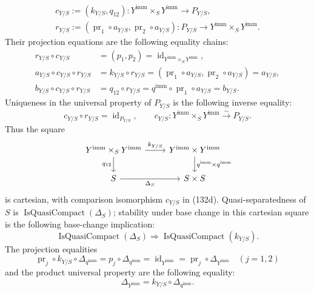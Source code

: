 \begin{definition}
\[\begin{gathered}
    c_{Y/S}:=(k_{Y/S},q_{12})\colon
      Y^{\mathrm{imm}}\times_SY^{\mathrm{imm}}\to P_{Y/S},\\
    r_{Y/S}:=(\operatorname{pr}_1\circ a_{Y/S},
      \operatorname{pr}_2\circ a_{Y/S})\colon
      P_{Y/S}\to Y^{\mathrm{imm}}\times_SY^{\mathrm{imm}}.     
  \end{gathered} \tag{132c}
  \]
  Their projection equations are the following equality chains:
  \[
  \begin{aligned}
    r_{Y/S}\circ c_{Y/S}
      &=(p_1,p_2)=\operatorname{id}_{
        Y^{\mathrm{imm}}\times_SY^{\mathrm{imm}}},\\
    a_{Y/S}\circ c_{Y/S}\circ r_{Y/S}
      &=k_{Y/S}\circ r_{Y/S}
       =(\operatorname{pr}_1\circ a_{Y/S},
          \operatorname{pr}_2\circ a_{Y/S})=a_{Y/S},\\
    b_{Y/S}\circ c_{Y/S}\circ r_{Y/S}
      &=q_{12}\circ r_{Y/S}
       =q^{\mathrm{imm}}\circ\operatorname{pr}_1\circ a_{Y/S}
       =b_{Y/S}.
  \end{aligned}
  \]
  Uniqueness in the universal property of $P_{Y/S}$ is the following inverse
  equality:
  \[
    c_{Y/S}\circ r_{Y/S}=\operatorname{id}_{P_{Y/S}},
    \qquad
    c_{Y/S}\colon
      Y^{\mathrm{imm}}\times_SY^{\mathrm{imm}}
        \xrightarrow{\sim}P_{Y/S}.                              \tag{132d}
  \]
  Thus the square
  \[
  \begin{tikzcd}
    Y^{\mathrm{imm}}\times_SY^{\mathrm{imm}}
      \arrow[r,"k_{Y/S}"] \arrow[d,"q_{12}"'] &
      Y^{\mathrm{imm}}\times Y^{\mathrm{imm}}
      \arrow[d,"q^{\mathrm{imm}}\times q^{\mathrm{imm}}"]\\
    S \arrow[r,"\Delta_S"'] & S\times S
  \end{tikzcd}
  \]
  is cartesian, with comparison isomorphism $c_{Y/S}$ in (132d).
  Quasi-separatedness of $S$ is
  $\operatorname{IsQuasiCompact}(\Delta_S)$; stability under base change in
  this cartesian square is the following base-change implication:
  \[
    \operatorname{IsQuasiCompact}(\Delta_S)
      \Longrightarrow
      \operatorname{IsQuasiCompact}(k_{Y/S}).                   \tag{132e}
  \]
  The projection equalities
  \[
    \operatorname{pr}_j\circ k_{Y/S}\circ
      \Delta_{q^{\mathrm{imm}}}
      =p_j\circ\Delta_{q^{\mathrm{imm}}}
      =\operatorname{id}_{Y^{\mathrm{imm}}}
      =\operatorname{pr}_j\circ\Delta_{Y^{\mathrm{imm}}}
      \quad(j=1,2)
  \]
  and the product universal property are the following equality:
  \[
    \Delta_{Y^{\mathrm{imm}}}
      =k_{Y/S}\circ\Delta_{q^{\mathrm{imm}}}.                   \tag{133}
\]
\end{definition}
